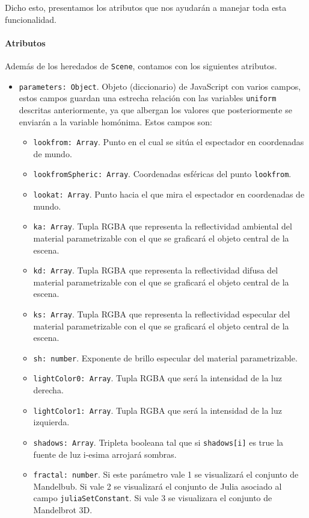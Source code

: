Dicho esto, presentamos los atributos que nos ayudarán a manejar toda esta funcionalidad.

\paragraph{Atributos}
Además de los heredados de \verb|Scene|, contamos con los siguientes atributos.
\begin{itemize}
    \item \verb|parameters: Object|. Objeto (diccionario) de JavaScript con varios campos, estos campos guardan una estrecha relación con las variables \verb|uniform| descritas anteriormente, ya que albergan los valores que posteriormente se enviarán a la variable homónima. Estos campos son:
    \begin{itemize}
        \item \verb|lookfrom: Array|. Punto en el cual se sitúa el espectador en coordenadas de mundo.
        \item \verb|lookfromSpheric: Array|. Coordenadas esféricas del punto \verb|lookfrom|.
        \item \verb|lookat: Array|. Punto hacia el que mira el espectador en coordenadas de mundo.
        \item \verb|ka: Array|. Tupla RGBA que representa la reflectividad ambiental del material parametrizable con el que se graficará el objeto central de la escena.
        \item \verb|kd: Array|. Tupla RGBA que representa la reflectividad difusa del material parametrizable con el que se graficará el objeto central de la escena.
        \item \verb|ks: Array|. Tupla RGBA que representa la reflectividad especular del material parametrizable con el que se graficará el objeto central de la escena.
        \item \verb|sh: number|. Exponente de brillo especular del material parametrizable.
        \item \verb|lightColor0: Array|. Tupla RGBA que será la intensidad de la luz derecha.
        \item \verb|lightColor1: Array|. Tupla RGBA que será la intensidad de la luz izquierda.
        \item \verb|shadows: Array|. Tripleta booleana tal que si \verb|shadows[i]| es true la fuente de luz i-esima arrojará sombras.
        \item \verb|fractal: number|. Si este parámetro vale 1 se visualizará el conjunto de Mandelbub. Si vale 2 se visualizará el conjunto de Julia asociado al campo \verb|juliaSetConstant|. Si vale 3 se visualizara el conjunto de Mandelbrot 3D.

\end{itemize}
\end{itemize}
